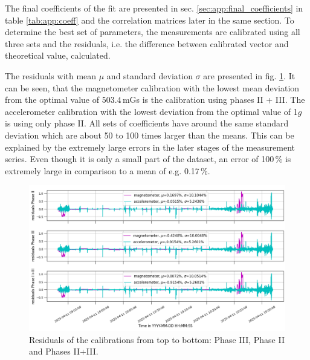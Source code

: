 The final coefficients of the fit are presented in sec. \ref{sec:app:final_coefficients} in table \ref{tab:app:coeff} and the correlation matrices later in the same section. To determine the best set of parameters, the measurements are calibrated using all three sets and the residuals, i.e. the difference between calibrated vector and theoretical value, calculated. 

The residuals with mean $\mu$ and standard deviation $\sigma$ are presented in fig. \ref{fig:res:residuals}. It can be seen, that the magnetometer calibration with the lowest mean deviation from the optimal value of $503.4$\,mGs is the calibration using phases II + III. The accelerometer calibration with the lowest deviation from the optimal value of 1$g$ is using only phase II. All sets of coefficients have around the same standard deviation which are about 50 to 100 times larger than the means. This can be explained by the extremely large errors in the later stages of the measurement series. Even though it is only a small part of the dataset, an error of 100\,\% is extremely large in comparison to a mean of e.g. 0.17\,\%.
\begin{figure}[H]
    \centering
    \includegraphics[width=\linewidth]{images/04_results/residuals_mag_acc_calibrations.png}
    \caption[Residuals of the calibrations.]{Residuals of the calibrations from top to bottom: Phase III, Phase II and Phases II+III.}
    \label{fig:res:residuals}
\end{figure}

